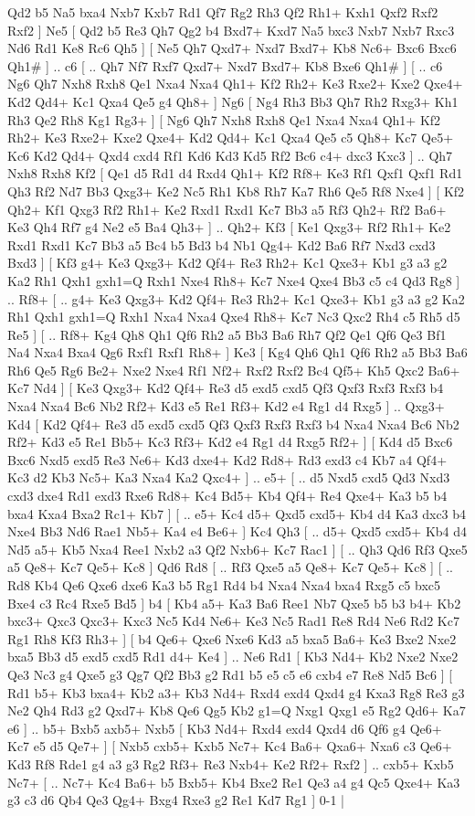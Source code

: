  Qd2 b5  Na5 bxa4  Nxb7 Kxb7  Rd1 Qf7  Rg2 Rh3  Qf2 Rh1+  Kxh1 Qxf2  Rxf2 Rxf2   ]  Ne5 [  Qd2 b5  Re3 Qh7  Qg2 b4  Bxd7+ Kxd7  Na5 bxc3  Nxb7 Nxb7  Rxc3 Nd6  Rd1 Ke8  Rc6 Qh5   ]  [  Ne5 Qh7  Qxd7+ Nxd7  Bxd7+ Kb8  Nc6+ Bxc6  Bxc6 Qh1#   ] .. c6 [ .. Qh7  Nf7 Rxf7  Qxd7+ Nxd7  Bxd7+ Kb8  Bxe6 Qh1#   ]  [ .. c6  Ng6 Qh7  Nxh8 Rxh8  Qe1 Nxa4  Nxa4 Qh1+  Kf2 Rh2+  Ke3 Rxe2+  Kxe2 Qxe4+  Kd2 Qd4+  Kc1 Qxa4  Qe5 g4  Qh8+   ]  Ng6    [  Ng4 Rh3  Bb3 Qh7  Rh2 Rxg3+  Kh1 Rh3  Qe2 Rh8  Kg1 Rg3+   ]  [  Ng6 Qh7  Nxh8 Rxh8  Qe1 Nxa4  Nxa4 Qh1+  Kf2 Rh2+  Ke3 Rxe2+  Kxe2 Qxe4+  Kd2 Qd4+  Kc1 Qxa4  Qe5 c5  Qh8+ Kc7  Qe5+ Kc6  Kd2 Qd4+  Qxd4 cxd4  Rf1 Kd6  Kd3 Kd5  Rf2 Bc6  c4+ dxc3  Kxc3   ] .. Qh7    Nxh8   Rxh8    Kf2 [  Qe1 d5  Rd1 d4  Rxd4 Qh1+  Kf2 Rf8+  Ke3 Rf1  Qxf1 Qxf1  Rd1 Qh3  Rf2 Nd7  Bb3 Qxg3+  Ke2 Nc5  Rh1 Kb8  Rh7 Ka7  Rh6 Qe5  Rf8 Nxe4   ]  [  Kf2 Qh2+  Kf1 Qxg3  Rf2 Rh1+  Ke2 Rxd1  Rxd1 Kc7  Bb3 a5  Rf3 Qh2+  Rf2 Ba6+  Ke3 Qh4  Rf7 g4  Ne2 e5  Ba4 Qh3+   ] .. Qh2+    Kf3 [  Ke1 Qxg3+  Rf2 Rh1+  Ke2 Rxd1  Rxd1 Kc7  Bb3 a5  Bc4 b5  Bd3 b4  Nb1 Qg4+  Kd2 Ba6  Rf7 Nxd3  cxd3 Bxd3   ]  [  Kf3 g4+  Ke3 Qxg3+  Kd2 Qf4+  Re3 Rh2+  Kc1 Qxe3+  Kb1 g3  a3 g2  Ka2 Rh1  Qxh1 gxh1=Q  Rxh1 Nxe4  Rh8+ Kc7  Nxe4 Qxe4  Bb3 c5  c4 Qd3  Rg8   ] .. Rf8+ [ .. g4+  Ke3 Qxg3+  Kd2 Qf4+  Re3 Rh2+  Kc1 Qxe3+  Kb1 g3  a3 g2  Ka2 Rh1  Qxh1 gxh1=Q  Rxh1 Nxa4  Nxa4 Qxe4  Rh8+ Kc7  Nc3 Qxc2  Rh4 c5  Rh5 d5  Re5   ]  [ .. Rf8+  Kg4 Qh8  Qh1 Qf6  Rh2 a5  Bb3 Ba6  Rh7 Qf2  Qe1 Qf6  Qe3 Bf1  Na4 Nxa4  Bxa4 Qg6  Rxf1 Rxf1  Rh8+   ]  Ke3 [  Kg4 Qh6  Qh1 Qf6  Rh2 a5  Bb3 Ba6  Rh6 Qe5  Rg6 Be2+  Nxe2 Nxe4  Rf1 Nf2+  Rxf2 Rxf2  Bc4 Qf5+  Kh5 Qxc2  Ba6+ Kc7  Nd4   ]  [  Ke3 Qxg3+  Kd2 Qf4+  Re3 d5  exd5 cxd5  Qf3 Qxf3  Rxf3 Rxf3  b4 Nxa4  Nxa4 Bc6  Nb2 Rf2+  Kd3 e5  Re1 Rf3+  Kd2 e4  Rg1 d4  Rxg5   ] .. Qxg3+    Kd4 [  Kd2 Qf4+  Re3 d5  exd5 cxd5  Qf3 Qxf3  Rxf3 Rxf3  b4 Nxa4  Nxa4 Bc6  Nb2 Rf2+  Kd3 e5  Re1 Bb5+  Kc3 Rf3+  Kd2 e4  Rg1 d4  Rxg5 Rf2+   ]  [  Kd4 d5  Bxc6 Bxc6  Nxd5 exd5  Re3 Ne6+  Kd3 dxe4+  Kd2 Rd8+  Rd3 exd3  c4 Kb7  a4 Qf4+  Kc3 d2  Kb3 Nc5+  Ka3 Nxa4  Ka2 Qxc4+   ] .. e5+ [ .. d5  Nxd5 cxd5  Qd3 Nxd3  cxd3 dxe4  Rd1 exd3  Rxe6 Rd8+  Kc4 Bd5+  Kb4 Qf4+  Re4 Qxe4+  Ka3 b5  b4 bxa4  Kxa4 Bxa2  Rc1+ Kb7   ]  [ .. e5+  Kc4 d5+  Qxd5 cxd5+  Kb4 d4  Ka3 dxc3  b4 Nxe4  Bb3 Nd6  Rae1 Nb5+  Ka4 e4  Be6+   ]  Kc4  Qh3 [ .. d5+  Qxd5 cxd5+  Kb4 d4  Nd5 a5+  Kb5 Nxa4  Ree1 Nxb2  a3 Qf2  Nxb6+ Kc7  Rac1   ]  [ .. Qh3  Qd6 Rf3  Qxe5 a5  Qe8+ Kc7  Qe5+ Kc8   ]  Qd6   Rd8 [ .. Rf3  Qxe5 a5  Qe8+ Kc7  Qe5+ Kc8   ]  [ .. Rd8  Kb4 Qe6  Qxe6 dxe6  Ka3 b5  Rg1 Rd4  b4 Nxa4  Nxa4 bxa4  Rxg5 c5  bxc5 Bxe4  c3 Rc4  Rxe5 Bd5   ]  b4 [  Kb4 a5+  Ka3 Ba6  Ree1 Nb7  Qxe5 b5  b3 b4+  Kb2 bxc3+  Qxc3 Qxc3+  Kxc3 Nc5  Kd4 Ne6+  Ke3 Nc5  Rad1 Re8  Rd4 Ne6  Rd2 Kc7  Rg1 Rh8  Kf3 Rh3+   ]  [  b4 Qe6+  Qxe6 Nxe6  Kd3 a5  bxa5 Ba6+  Ke3 Bxe2  Nxe2 bxa5  Bb3 d5  exd5 cxd5  Rd1 d4+  Ke4   ] .. Ne6    Rd1 [  Kb3 Nd4+  Kb2 Nxe2  Nxe2 Qe3  Nc3 g4  Qxe5 g3  Qg7 Qf2  Bb3 g2  Rd1 b5  e5 c5  e6 cxb4  e7 Re8  Nd5 Bc6   ]  [  Rd1 b5+  Kb3 bxa4+  Kb2 a3+  Kb3 Nd4+  Rxd4 exd4  Qxd4 g4  Kxa3 Rg8  Re3 g3  Ne2 Qh4  Rd3 g2  Qxd7+ Kb8  Qe6 Qg5  Kb2 g1=Q  Nxg1 Qxg1  e5 Rg2  Qd6+ Ka7  e6   ] .. b5+    Bxb5   axb5+    Nxb5 [  Kb3 Nd4+  Rxd4 exd4  Qxd4 d6  Qf6 g4  Qe6+ Kc7  e5 d5  Qe7+   ]  [  Nxb5 cxb5+  Kxb5 Nc7+  Kc4 Ba6+  Qxa6+ Nxa6  c3 Qe6+  Kd3 Rf8  Rde1 g4  a3 g3  Rg2 Rf3+  Re3 Nxb4+  Ke2 Rf2+  Rxf2   ] .. cxb5+    Kxb5  Nc7+    [ .. Nc7+  Kc4 Ba6+  b5 Bxb5+  Kb4 Bxe2  Re1 Qe3  a4 g4  Qc5 Qxe4+  Ka3 g3  c3 d6  Qb4 Qe3  Qg4+ Bxg4  Rxe3 g2  Re1 Kd7  Rg1   ] 0-1  |
